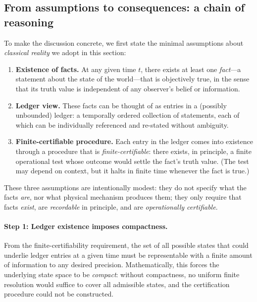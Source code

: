 \documentclass[12pt]{article}
\theoremstyle{definition}
\theoremstyle{plain}
\begin{document}
\subsection{From assumptions to consequences: a chain of reasoning}

To make the discussion concrete, we first state the minimal assumptions
about \emph{classical reality} we adopt in this section:

\begin{enumerate}[leftmargin=1.5em,itemsep=2pt]
  \item \textbf{Existence of facts.}  
  At any given time $t$, there exists at least one \emph{fact}---a statement
  about the state of the world---that is objectively true, in the sense
  that its truth value is independent of any observer's belief or
  information.
  \item \textbf{Ledger view.}  
  These facts can be thought of as entries in a (possibly unbounded) ledger:
  a temporally ordered collection of statements, each of which can be
  individually referenced and re-stated without ambiguity.
  \item \textbf{Finite-certifiable procedure.}  
  Each entry in the ledger comes into existence through a procedure
  that is \emph{finite-certifiable}: there exists, in principle, a finite
  operational test whose outcome would settle the fact's truth value.
  (The test may depend on context, but it halts in finite time whenever
  the fact is true.)
\end{enumerate}

These three assumptions are intentionally modest:
they do not specify what the facts \emph{are}, nor what physical mechanism
produces them; they only require that facts \emph{exist},
are \emph{recordable} in principle, and are \emph{operationally certifiable}.

\paragraph{Step 1: Ledger existence imposes compactness.}
From the finite-certifiability requirement, the set of all possible
states that could underlie ledger entries at a given time
must be representable with a finite amount of information to any desired
precision.
Mathematically, this forces the underlying state space to be \emph{compact}:
without compactness, no uniform finite resolution would suffice to
cover all admissible states, and the certification procedure could not
be constructed.
\end{document}
